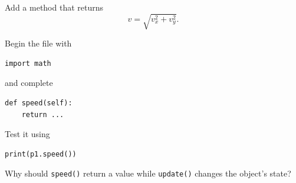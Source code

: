 \documentclass{article}
\begin{document}
Add a method that returns
\[
v=\sqrt{v_x^2+v_y^2}.
\]

Begin the file with

\begin{verbatim}
import math
\end{verbatim}

and complete

\begin{verbatim}
def speed(self):
    return ...
\end{verbatim}

Test it using

\begin{verbatim}
print(p1.speed())
\end{verbatim}

Why should \texttt{speed()} return a value while
\texttt{update()} changes the object's state?
\end{document}
